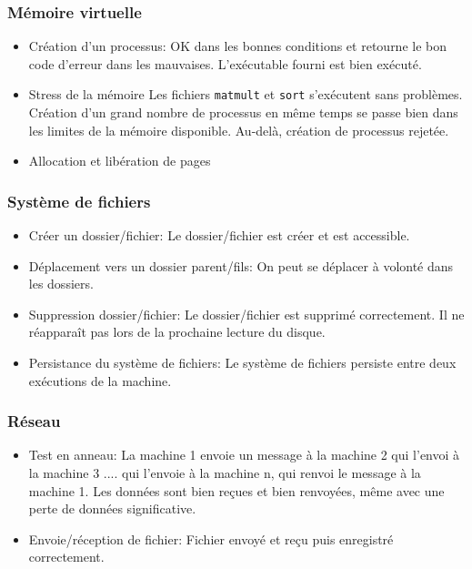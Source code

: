 \documentclass{article}
\begin{document}
		\subsubsection{Mémoire virtuelle}
			\begin{itemize}
				\item Création d'un processus: OK dans les bonnes conditions et retourne le bon code d'erreur dans les mauvaises.
					\subitem L'exécutable fourni est bien exécuté.
				\item Stress de la mémoire
					\subitem Les fichiers \texttt{matmult} et \texttt{sort} s'exécutent sans problèmes.
					\subitem Création d'un grand nombre de processus en même temps se passe bien dans les limites de la mémoire disponible. Au-delà, création de processus rejetée.
				\item Allocation et libération de pages
				
			\end{itemize}

		\subsubsection{Système de fichiers}
			\begin{itemize}
				\item Créer un dossier/fichier: Le dossier/fichier est créer et est accessible.
				\item Déplacement vers un dossier parent/fils: On peut se déplacer à volonté dans les dossiers.
				\item Suppression dossier/fichier: Le dossier/fichier est supprimé correctement. Il ne réapparaît pas lors de la prochaine lecture du disque.
				\item Persistance du système de fichiers: Le système de fichiers persiste entre deux exécutions de la machine.
			\end{itemize}

		\subsubsection{Réseau}
			\begin{itemize}
				\item Test en anneau: La machine 1 envoie un message à la machine 2 qui l'envoi à la machine 3 .... qui l'envoie à la machine n, qui renvoi le message à la machine 1.
					\subitem Les données sont bien reçues et bien renvoyées, même avec une perte de données significative.
				\item Envoie/réception de fichier: Fichier envoyé et reçu puis enregistré correctement.
			\end{itemize}
\end{document}
